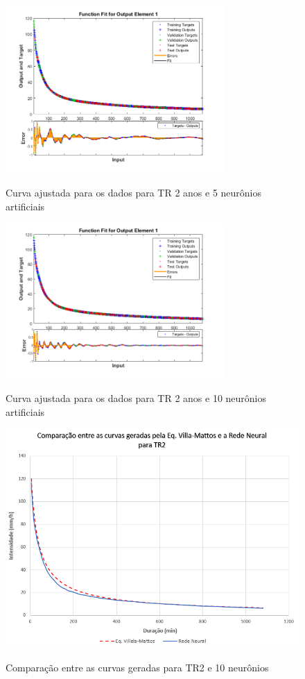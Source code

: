\begin{figure}[H]
    \caption{Curva ajustada para os dados para TR 2 anos e 5 neurônios artificiais}
    \centering
    \includegraphics[width=0.74\textwidth]{Textuais/Figuras/NN/tr2-5neuronio.png}
    \label{fig:tr2-5n}
\end{figure}

\begin{figure}[H]
    \caption{Curva ajustada para os dados para TR 2 anos e 10 neurônios artificiais}
    \centering
    \includegraphics[width=0.74\textwidth]{Textuais/Figuras/NN/tr2-10neuronio.png}
    \label{fig:tr2-10n}
\end{figure}

\begin{figure}[H]
    \caption{Comparação entre as curvas geradas para TR2 e 10 neurônios}
    \centering
    \includegraphics[width=\textwidth]{Textuais/Resultados/Comparacao/TR2.png}
    \label{fig:comp-tr2}
\end{figure}